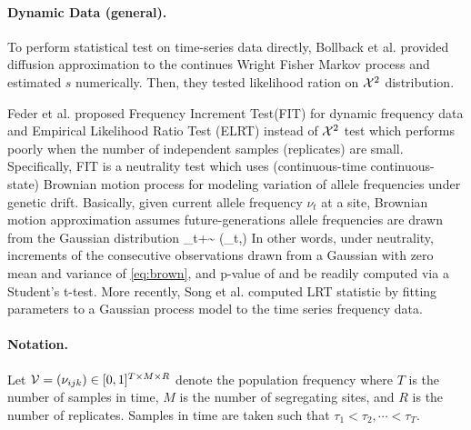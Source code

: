 \documentclass[11pt]{article}
\begin{document}
\paragraph{Dynamic Data (general).} 
To perform statistical test on time-series data directly, Bollback et al. \cite{bollback2008estimation} provided diffusion approximation to the continues Wright Fisher Markov process and estimated $s$ numerically. Then, they tested likelihood ration on ${\cal X}^2$ distribution.

Feder et al. \cite{feder2014Identifying} proposed Frequency Increment
Test(FIT) for dynamic frequency data and Empirical Likelihood Ratio Test (ELRT) instead of ${\cal X}^2$ test which performs poorly when the number of independent samples (replicates) are small.
Specifically, FIT is a neutrality test which uses (continuous-time 
continuous-state) Brownian motion process for modeling variation of 
 allele frequencies under genetic drift. 
 Basically, given current allele frequency 
 $\nu_t$ at a site, Brownian motion approximation assumes 
 future-generations allele 
 frequencies are drawn from the Gaussian distribution
 \beq
 \nu_{t+\tau}\sim 
 \Nc\left(\nu_t,\tau\right) 
 \label{eq:brown}
 \eeq
 In other words, under neutrality, increments of the consecutive observations 
 drawn from a Gaussian with 
 zero mean and variance of \eqref{eq:brown}, and p-value of and be readily 
 computed via a Student's t-test. More recently, Song et al. 
 \cite{Terhorst2015Multi} computed LRT statistic by fitting 
 parameters to a Gaussian process model to the time series frequency data. 


\paragraph{Notation.} Let ${\cal V}  = (\nu_{ijk}) \in [0, 1]^{T \times 
M\times R}$ denote the population frequency where $T$ is the number of samples 
in time, $M$ is the number of segregating sites, and $R$ is the number of 
replicates. Samples in time are taken such that $\tau_1<\tau_2,\cdots<\tau_T$.
\end{document}

